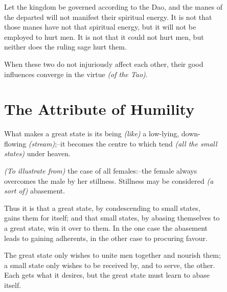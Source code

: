     Let the kingdom be governed according to the Dao, and the manes of\\
    the departed will not manifest their spiritual energy. It is not that\\
    those manes have not that spiritual energy, but it will not be\\
    employed to hurt men. It is not that it could not hurt men, but\\
    neither does the ruling sage hurt them.\vspace{\baselineskip}
    
    When these two do not injuriously affect each other, their good\\
    influences converge in the virtue \textit{(of the Tao)}.\vspace{\baselineskip}

\section*{The Attribute of Humility}
    What makes a great state is its being \textit{(like)} a low-lying, down-\\
    flowing \textit{(stream)};--it becomes the centre to which tend \textit{(all the small\\
    states)} under heaven.\vspace{\baselineskip}
    
    \textit{(To illustrate from)} the case of all females:--the female always\\
    overcomes the male by her stillness. Stillness may be considered \textit{(a\\
    sort of)} abasement.\vspace{\baselineskip}
    
    Thus it is that a great state, by condescending to small states,\\
    gains them for itself; and that small states, by abasing themselves to\\
    a great state, win it over to them. In the one case the abasement\\
    leads to gaining adherents, in the other case to procuring favour.\vspace{\baselineskip}
    
    The great state only wishes to unite men together and nourish them;\\
    a small state only wishes to be received by, and to serve, the other.\\
    Each gets what it desires, but the great state must learn to abase\\
    itself.\vspace{\baselineskip}
